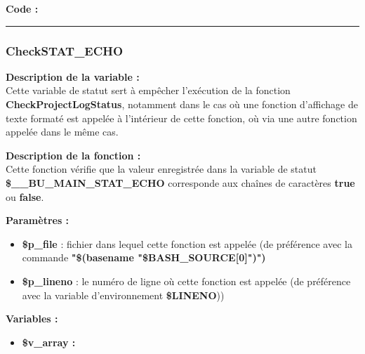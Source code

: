 \documentclass[a4paper,10pt]{article}
\begin{document}
\begin{justify}
    \textbf{Code :}
\end{justify}




\color{blue}\par\noindent\rule{\textwidth}{0.4pt}\color{white}

\color{blue}
\subsubsection{CheckSTAT\_ECHO}\color{white}

\begin{justify}
    \textbf{Description de la variable :}\\
    Cette variable de statut sert à empêcher l'exécution de la fonction \textbf{\color{mauve}CheckProjectLogStatus}, notamment dans le cas où une fonction d'affichage de texte formaté est appelée à l'intérieur de cette fonction, où via une autre fonction appelée dans le même cas.
\end{justify}

\begin{justify}
    \textbf{Description de la fonction :}\\
    Cette fonction vérifie que la valeur enregistrée dans la variable de statut \textbf{\color{orange}\$\_\_BU\_MAIN\_STAT\_ECHO} corresponde aux chaînes de caractères \textbf{true} ou \textbf{false}.
\end{justify}

\begin{justify}
    \textbf{Paramètres :}

    \begin{itemize}
        \item \color{orange}\textbf{\$p\_file}\color{white} : fichier dans lequel cette fonction est appelée (de préférence avec la commande \textbf{"\$(\color{gray}basename \color{white}"\color{orange}\$BASH\_SOURCE[0]\color{white}")")}

        \item \color{orange}\textbf{\$p\_lineno}\color{white} : le numéro de ligne où cette fonction est appelée (de préférence avec la variable d'environnement \textbf{\color{orange}\$LINENO}))
    \end{itemize}
\end{justify}

\begin{justify}
    \textbf{Variables :}

    \begin{itemize}
        \item \textbf{\color{orange}\$v\_array\color{white} :}
    \end{itemize}
\end{justify}
\end{document}
